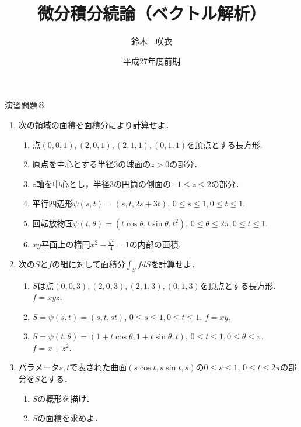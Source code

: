 \documentclass{jarticle}
\begin{document}
\title{微分積分続論（ベクトル解析）} 
\author{鈴木　咲衣}
\date{平成27年度前期}
\maketitle

\begin{center} {\Large 演習問題８ } \end{center}
\begin{enumerate}
\item \cite[練習問題4.9, 4.11, 章末問題4.5]{koba} 次の領域の面積を面積分により計算せよ．
\begin{enumerate}
\item 点$(0,0,1), (2,0,1),(2,1,1), (0,1,1)$を頂点とする長方形.
\item 原点を中心とする半径$3$の球面の$z>0$の部分．
\item $z$軸を中心とし，半径$3$の円筒の側面の$-1\leq z\leq 2$の部分．
\item 平行四辺形$\psi(s,t)=(s,t,2s+3t)$, $0\leq s\leq 1, 0\leq t\leq 1$.
\item 回転放物面$\psi(t, \theta)=(t\cos \theta,t\sin \theta, t^{2})$, $0\leq \theta \leq 2\pi, 0\leq t\leq 1$.
\item $xy$平面上の楕円$x^{2}+\frac{y^{2}}{4}=1$の内部の面積.
\end{enumerate}
\item \cite[章末問題4.6]{koba} 次の$S$と$f$の組に対して面積分$\int_{S}f dS$を計算せよ．
\begin{enumerate}
\item $S$は点$(0,0,3), (2,0,3),(2,1,3), (0,1,3)$を頂点とする長方形. $f=xyz$.
\item $S=\psi(s,t)=(s,t,st)$, $0\leq s\leq 1, 0\leq t\leq 1$. $f=xy$.
\item  $S=\psi(t,\theta)=(1+t\cos \theta ,1+t\sin \theta, t)$, $0\leq t\leq 1, 0\leq \theta \leq \pi$. $f=x+z^{2}$.
\end{enumerate}
\item  \cite[章末問題4.7]{koba} パラメータ$s,t$で表された曲面$(s\cos t, s\sin t, s)$の$0\leq s \leq 1$, $0\leq t\leq 2\pi$の部分を$S$とする．
\begin{enumerate}
\item $S$の概形を描け．
\item $S$の面積を求めよ．
\end{enumerate}
\end{enumerate}

\newpage
\end{document}
